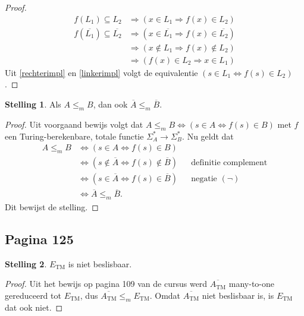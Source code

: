 \documentclass[kulak]{kulakarticle}
\theoremstyle{definition}
\newtheorem*{stelling}{Stelling}
\begin{document}
	\begin{proof}
		\begin{align}
			f(L_1) \subseteq L_2                       & \Rightarrow (x \in L_1 \Rightarrow f(x) \in L_2) \label{rechterimpl} \\
			f(\overline{L_1}) \subseteq \overline{L_2} & \Rightarrow (x \in \overline{L_1} \Rightarrow f(x) \in \overline{L_2})\nonumber \\
														& \Rightarrow (x \notin L_1 \Rightarrow f(x) \notin L_2)\nonumber \\
														& \Rightarrow (f(x) \in L_2 \Rightarrow x \in L_1) \label{linkerimpl}
		\end{align}
		Uit \eqref{rechterimpl} en \eqref{linkerimpl} volgt de equivalentie \((s\in L_1 \Leftrightarrow f(s)\in L_2)\).
	\end{proof}

	\begin{stelling}
		Als \(A \leq_m B\), dan ook \(\overline{A} \leq_m \overline{B}\).
	\end{stelling}

	\begin{proof}
		Uit voorgaand bewijs volgt dat \(A \leq_m B \Leftrightarrow (s\in A \Leftrightarrow f(s)\in B)\) met \( f \) een Turing-berekenbare, totale functie \(\Sigma_A^*\to\Sigma_B^*\). Nu geldt dat \begin{align*}
			A \leq_m B & \Leftrightarrow (s\in A \Leftrightarrow f(s)\in B) \\
			& \Leftrightarrow (s\notin \overline{A} \Leftrightarrow f(s)\notin \overline{B}) && \text{definitie complement} \\
			& \Leftrightarrow (s\in \overline{A} \Leftrightarrow f(s)\in \overline{B}) && \text{negatie } (\neg) \\
			& \Leftrightarrow \overline{A} \leq_m \overline{B}.
		\end{align*}
		Dit bewijst de stelling.
	\end{proof}

	\subsection*{Pagina 125}

	\begin{stelling}
		\(E_\text{TM}\) is niet beslisbaar.
	\end{stelling}

	\begin{proof}
		Uit het bewijs op pagina 109 van de cursus werd \(\overline{A_\text{TM}}\) many-to-one gereduceerd tot \(E_\text{TM}\), dus \(\overline{A_\text{TM}} \leq_m E_\text{TM}\). Omdat \(\overline{A_\text{TM}}\) niet beslisbaar is, is \(E_\text{TM}\) dat ook niet.
	\end{proof}
\end{document}
